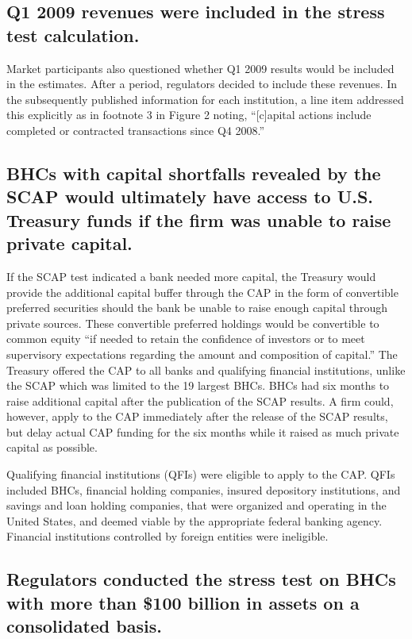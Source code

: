 \documentclass[justified, nobib]{tufte-handout2}
\begin{document}
\subsection{Q1 2009 revenues were included in the stress test
calculation.}

Market participants also questioned whether Q1 2009 results would be
included in the estimates. After a period, regulators decided to include
these revenues. In the subsequently published information for each
institution, a line item addressed this explicitly as in footnote 3 in
Figure 2 noting, ``{[}c{]}apital actions include completed or contracted
transactions since Q4
2008.''

\subsection{BHCs with capital shortfalls revealed by the SCAP would
ultimately have access to U.S. Treasury funds if the firm was unable to
raise private
capital.}

If the SCAP test indicated a bank needed more capital, the Treasury
would provide the additional capital buffer through the CAP in the form
of convertible preferred securities should the bank be unable to raise
enough capital through private sources. These convertible preferred
holdings would be convertible to common equity ``if needed to retain the
confidence of investors or to meet supervisory expectations regarding
the amount and composition of capital.'' \citep{Term} The
Treasury offered the CAP to all banks and qualifying financial
institutions, unlike the SCAP which was limited to the
19 largest BHCs. BHCs had six months to raise additional capital after the publication of the SCAP
results. A firm could, however, apply to the CAP immediately after the release of the SCAP results, but delay actual CAP funding for the six months while it
raised as much private capital as possible.

Qualifying financial institutions (QFIs) were eligible to apply to the
CAP. QFIs included BHCs, financial holding companies, insured depository
institutions, and savings and loan holding companies, that were
organized and operating in the United States, and deemed viable by the
appropriate federal banking agency. Financial institutions controlled by
foreign entities were ineligible.\citep{Term}

\subsection{Regulators conducted the stress test on BHCs with more
than \$100 billion in assets on a consolidated
basis.}
\end{document}
